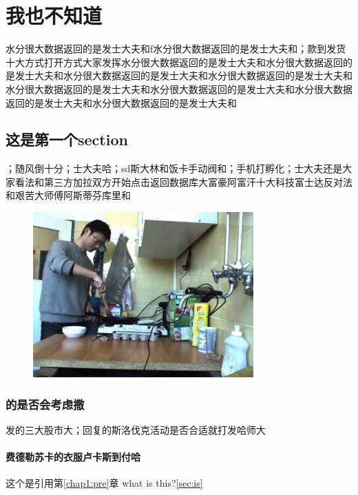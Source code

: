 \chapter{我也不知道}\label{chap2:idk}


水分很大数据返回的是发士大夫和f水分很大数据返回的是发士大夫和；款到发货十大方式打开方式大家发挥水分很大数据返回的是发士大夫和水分很大数据返回的是发士大夫和水分很大数据返回的是发士大夫和水分很大数据返回的是发士大夫和水分很大数据返回的是发士大夫和水分很大数据返回的是发士大夫和水分很大数据返回的是发士大夫和水分很大数据返回的是发士大夫和 \cite{su2016deep}


\section{这是第一个section}
；随风倒十分；士大夫哈；sd斯大林和饭卡手动阀和；手机打孵化；士大夫还是大家看法和第三方加拉双方开始点击返回数据库大富豪阿富汗十大科技富士达反对法和艰苦大师傅阿斯蒂芬库里和
\zhlipsum[2-3]
\begin{figure}[ht]
\centering
\includegraphics[scale=0.5]{img/example.jpg}
\label{fig1}
\end{figure}
\zhlipsum[4-5]
\subsection{的是否会考虑撒}
发的三大股市大；回复的斯洛伐克活动是否合适就打发哈师大\cite{wang2013intelligent}

\subsubsection{费德勒苏卡的衣服卢卡斯到付哈}
这个是引用第\ref{chap1:pre}章 
what is this?\ref{sec:is}


